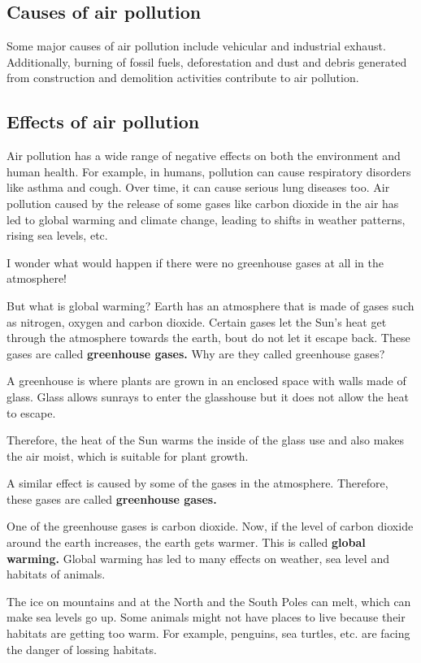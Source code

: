 \subsection{\textbf{Causes of air pollution}}
Some major causes of air pollution include vehicular and industrial exhaust. Additionally, burning of fossil fuels, deforestation and dust and debris generated from construction and demolition activities contribute to air pollution.
\subsection{\textbf{Effects of air pollution}}
Air pollution has a wide range of negative effects on both the environment and human health. For example, in humans, pollution can cause respiratory disorders like asthma and cough. Over time, it can cause serious lung diseases too. Air pollution caused by the release of some gases like carbon dioxide in the air has led to global warming and climate change, leading to shifts in weather patterns, rising sea levels, etc.
\vspace{0.1in}
\par
I wonder what would happen if there were no greenhouse gases at all in the atmosphere!
\vspace{0.1in}
\par
But what is global warming? Earth has an atmosphere that is made of gases such as nitrogen, oxygen and carbon dioxide. Certain gases let the Sun's heat get through the atmosphere towards the earth, bout do not let it escape back. These gases are called \textbf{greenhouse gases.} Why are they called greenhouse gases?
\vspace{0.1in}
\par
A greenhouse is where plants are grown in an enclosed space with walls made of glass. Glass allows sunrays to enter the glasshouse but it does not allow the heat to escape.
\vspace{0.4in}
\par
Therefore, the heat of the Sun warms the inside of the glass use and also makes the air moist, which is suitable for plant growth.
\vspace{0.1in}
\par
A similar effect is caused by some of the gases in the atmosphere. Therefore, these gases are called \textbf{greenhouse gases.}
\vspace{0.1in}
\par
One of the greenhouse gases is carbon dioxide. Now, if the level of carbon dioxide around the earth increases, the earth gets warmer. This is called \textbf{global warming.} Global warming has led to many effects on weather, sea level and habitats of animals.
\vspace{0.1in}
\par
The ice on mountains and at the North and the South Poles can melt, which can make sea levels go up. Some animals might not have places to live because their habitats are getting too warm. For example, penguins, sea turtles, etc. are facing the danger of lossing habitats.
\vspace{2.4in}
